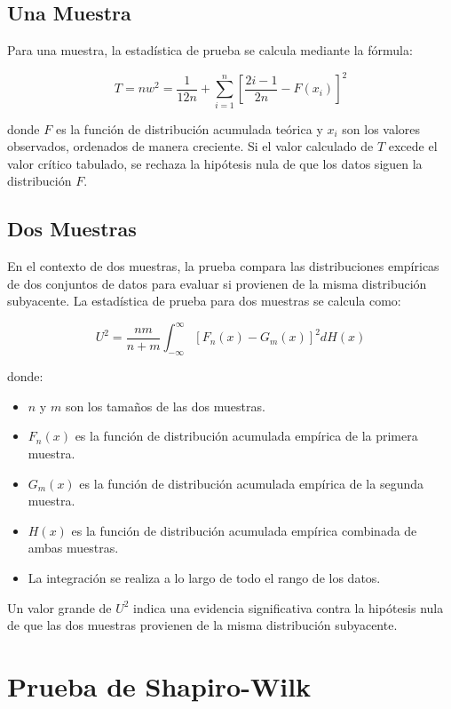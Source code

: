 \documentclass{article}
\begin{document}
\subsection*{Una Muestra}

Para una muestra, la estadística de prueba se calcula mediante la fórmula:

\[
    T = nw^2 = \frac{1}{12n} + \sum_{i=1}^{n}\left[\frac{2i - 1}{2n} - F(x_i)\right]^2
\]

donde \(F\) es la función de distribución acumulada teórica y \(x_i\) son los valores observados, ordenados de manera creciente. Si el valor calculado de \(T\) excede el valor crítico tabulado, se rechaza la hipótesis nula de que los datos siguen la distribución \(F\).

\subsection*{Dos Muestras}

En el contexto de dos muestras, la prueba compara las distribuciones empíricas de dos conjuntos de datos para evaluar si provienen de la misma distribución subyacente. La estadística de prueba para dos muestras se calcula como:

\[
    U^2 = \frac{n m}{n + m} \int_{-\infty}^{\infty} [F_n(x) - G_m(x)]^2 dH(x)
\]

donde:
\begin{itemize}
    \item \(n\) y \(m\) son los tamaños de las dos muestras.
    \item \(F_n(x)\) es la función de distribución acumulada empírica de la primera muestra.
    \item \(G_m(x)\) es la función de distribución acumulada empírica de la segunda muestra.
    \item \(H(x)\) es la función de distribución acumulada empírica combinada de ambas muestras.
    \item La integración se realiza a lo largo de todo el rango de los datos.
\end{itemize}

Un valor grande de \(U^2\) indica una evidencia significativa contra la hipótesis nula de que las dos muestras provienen de la misma distribución subyacente.


\section{Prueba de Shapiro-Wilk}
\end{document}
